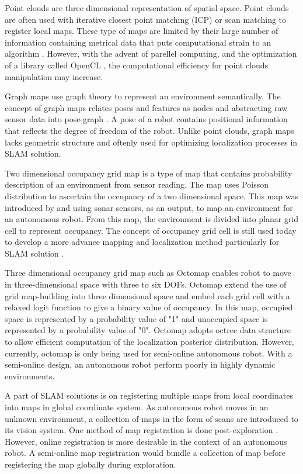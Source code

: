 \documentclass[a4paper,10pt]{article}
\begin{document}
Point clouds are three dimensional representation of spatial space. 
Point clouds are
often used with iterative closest point matching (ICP) or scan matching to
register local maps. These type of maps are limited by their large number of
information containing metrical data that puts computational strain to an
algorithm \citep{Olson2009}. However, with the advent of parellel computing,
and the optimization of a library called OpenCL \citep{Rusu2011}, the
computational efficiency for point clouds manipulation may increase.

Graph maps use graph theory to represent an environment semantically. The
concept of graph maps relates poses and features as nodes and abstracting raw
sensor data into pose-graph \citep{Grisetti2010}. A pose of a robot contains
positional information that reflects the degree of freedom of the robot.
Unlike point clouds, graph
maps lacks geometric structure and oftenly used for optimizing localization
processes in SLAM solution.

Two dimensional occupancy grid map is a type of map that contains probability description of an
environment from sensor reading. The map uses Poisson distribution to ascertain
the occupancy of a two dimensional space. This map was introduced by \citet{Moravec1988} and
\citet{Elfes1989} using sonar sensors, as an output, to map an environment for
an autonomous robot. From this map, the environment is divided into planar grid
cell to represent occupancy. The concept of occupancy grid cell is still used
today to develop a more advance mapping and localization method particularly for
SLAM solution \citep{Ray2012,Birk2006}. 

Three dimensional occupancy grid map such as Octomap \citep{Hornung2013} enables
robot to move in three-dimensional space with three to six DOFs. Octomap extend
the use of grid map-building into three dimensional space and embed each grid
cell with a relaxed logit function to give a binary value of occupancy. In this
map, occupied space is represented by a probability value of "1" and unoccupied
space is represented by a probability value of "0". Octomap adopts octree data
structure to allow efficient computation of the localization posterior
distribution. However, currently, octomap is only being used for semi-online
autonomous robot. With a semi-online design, an autonomous robot perform poorly
in highly dynamic environments. 

A part of SLAM solutions is on
registering multiple maps from local coordinates into maps in global coordinate
system. As autonomous robot moves in an unknown environment, a collection of
maps in the form of scans are introduced to its vision system. One method of
map registration is done post-exploration \citep{Burgard1999}. However, online
registration is more desirable in the context of an autonomous robot. A
semi-online map registration would bundle a collection of map before registering
the map globally during exploration. 
\end{document}
